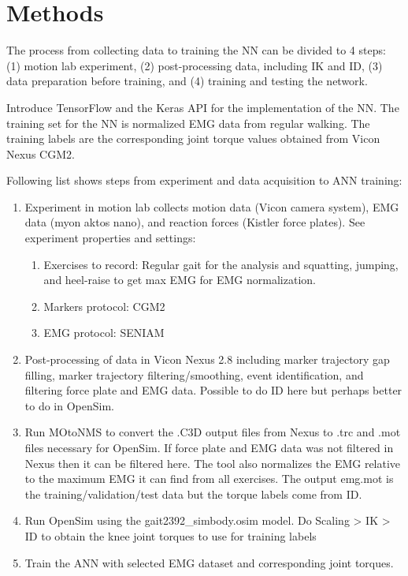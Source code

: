 \documentclass[../main.tex]{subfiles}
\begin{document}
\chapter{Methods}
The process from collecting data to training the \ac{NN} can be divided to 4 steps: (1) motion lab experiment, (2) post-processing data, including \ac{IK} and \ac{ID}, (3) data preparation before training, and (4) training and testing the network.


Introduce TensorFlow and the Keras API for the implementation of the \ac{NN}.
The training set for the \ac{NN} is normalized EMG data from regular walking.
The training labels are the corresponding joint torque values obtained from Vicon Nexus CGM2.

Following list shows steps from experiment and data acquisition to ANN training:
\begin{enumerate}
    \item Experiment in motion lab collects motion data (Vicon camera system), EMG data (myon aktos nano), and reaction forces (Kistler force plates). See experiment properties and settings:
    \begin{enumerate}
        \item Exercises to record: Regular gait for the analysis and squatting, jumping, and heel-raise to get max EMG for EMG normalization.
        \item Markers protocol: CGM2
        \item EMG protocol: SENIAM
    \end{enumerate}
    \item Post-processing of data in Vicon Nexus 2.8 including marker trajectory gap filling, marker trajectory filtering/smoothing, event identification, and filtering force plate and EMG data. Possible to do ID here but perhaps better to do in OpenSim.
    \item Run MOtoNMS to convert the .C3D output files from Nexus to .trc and .mot files necessary for OpenSim. If force plate and EMG data was not filtered in Nexus then it can be filtered here. The tool also normalizes the EMG relative to the maximum EMG it can find from all exercises. The output emg.mot is the training/validation/test data but the torque labels come from ID.
    \item Run OpenSim using the gait2392\_simbody.osim model. Do Scaling > IK > ID to obtain the knee joint torques to use for training labels
    \item Train the ANN with selected EMG dataset and corresponding joint torques.
\end{enumerate}
\end{document}
